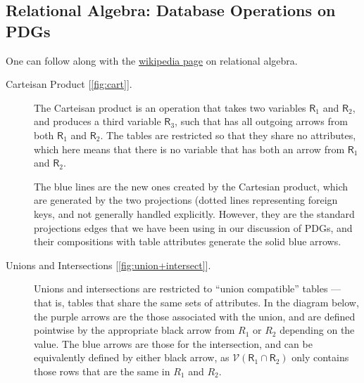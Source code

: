 \documentclass{article}
\theoremstyle{plain}
\theoremstyle{definition}
\theoremstyle{remark}
\newcommand{\V}{\mathcal V}
\newcommand{\var}[1]{\mathsf{#1}}
\begin{document}
\subsection{Relational Algebra: Database Operations on PDGs}
One can follow along with the \href{https://en.wikipedia.org/wiki/Relational_algebra}{wikipedia page} on relational algebra.

\begin{description}
\item[{Carteisan Product [\cref{fig:cart}].}]
The Carteisan product is an operation that takes two variables $\var R_1$ and $\var R_2$, and produces a third variable $\var R_3$, such that has all outgoing arrows from both $\var R_1$ and $\var R_2.$  The tables are restricted so that they share no attributes, which here means that there is no variable that has both an arrow from $\var R_1$ and $\var R_2$.

The blue lines are the new ones created by the Cartesian product, which are generated by the two projections (dotted lines representing foreign keys, and not generally handled explicitly. However, they are the standard projections edges that we have been using in our discussion of PDGs, and their compositions with table attributes generate the solid blue arrows.

\item[{Unions and Intersections  [\cref{fig:union+intersect}].}]
Unions and intersections are restricted to ``union compatible'' tables --- that is, tables that share the same sets of attributes. 
In the diagram below, the purple arrows are the those associated with the union, and are defined pointwise by the appropriate black arrow from $R_1$ or $R_2$ depending on the value. The blue arrows are those for the intersection, and can be equivalently defined by either black arrow, as $\V(\var R_1 \cap \var R_2)$ only contains those rows that are the same in $R_1$ and $R_2$.
\begin{figure}
	\begin{subfigure}{0.41\textwidth}
\end{subfigure}
\end{figure}
\end{description}
\end{document}
